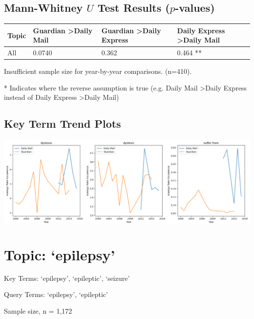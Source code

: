 \documentclass{report}
\begin{document}
\subsection{Mann-Whitney $U$ Test Results ($p$-values)}
\noindent
\begin{tabu} to \textwidth { | X[c] | X[c] | X[c] | X[c] | }  
	\hline
	Topic & Guardian \textgreater\space Daily Mail & Guardian \textgreater\space Daily Express & Daily Express \textgreater\space Daily Mail  \\
	\hline
	All & 0.0740 & 0.362 & 0.464 **  \\
	\hline
\end{tabu}

\noindent Insufficient sample size for year-by-year comparisons. (n=410).

\noindent ** Indicates where the reverse assumption is true (e.g. Daily Mail \textgreater\space Daily Express instead of Daily Express \textgreater\space Daily Mail)

\subsection{Key Term Trend Plots}
\includegraphics[width=\textwidth]{raw/dyslexia-terms.png}

\newpage
\section{Topic: `epilepsy'}
Key Terms: `epilepsy', `epileptic', `seizure'

\noindent Query Terms: `epilepsy', `epileptic'

\noindent Sample size, n = 1,172
\end{document}
